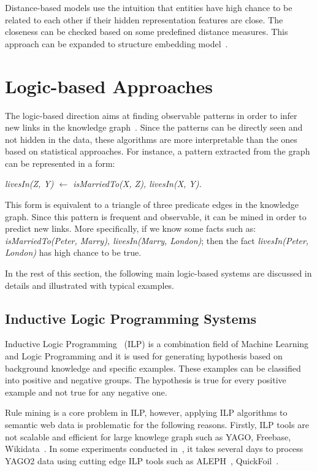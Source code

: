 Distance-based models use the intuition that entities have high chance to be related to each other if their hidden representation features are close. The closeness can be checked based on some predefined distance measures. This approach can be expanded to structure embedding model~\cite{ref8}.

\section{Logic-based Approaches}

The logic-based direction aims at finding observable patterns in order to infer new links in the knowledge graph~\cite{ref1}. Since the patterns can be directly seen and not hidden in the data, these algorithms are more interpretable than the ones based on statistical approaches. For instance, a pattern extracted from the graph can be represented in a form:\\

\centerline{\textit{livesIn(Z, Y) $\leftarrow$ isMarriedTo(X, Z), livesIn(X, Y).}}

This form is equivalent to a triangle of three predicate edges in the knowledge graph. Since this pattern is frequent and observable, it can be mined in order to predict new links. More specifically, if we know some facts such as: \textit{isMarriedTo(Peter, Marry), livesIn(Marry, London)}; then the fact \textit{livesIn(Peter, London)} has high chance to be true.

In the rest of this section, the following main logic-based systems are discussed in details and illustrated with typical examples.

\subsection{Inductive Logic Programming Systems}

Inductive Logic Programming~\cite{ref9} (ILP) is a combination field of Machine Learning and Logic Programming and it is used for generating hypothesis based on background knowledge and specific examples. These examples can be classified into positive and negative groups. The hypothesis is true for every positive example and not true for any negative one.

Rule mining is a core problem in ILP, however, applying ILP algorithms to semantic web data is problematic for the following reasons. Firstly, ILP tools are not scalable and efficient for large knowlege graph such as YAGO, Freebase, Wikidata~\cite{ref10}. In some experiments conducted in~\cite{ref10}, it takes several days to process YAGO2 data using cutting edge ILP tools such as ALEPH~\cite{ref14, ref10}, QuickFoil~\cite{ref15, ref10}.


